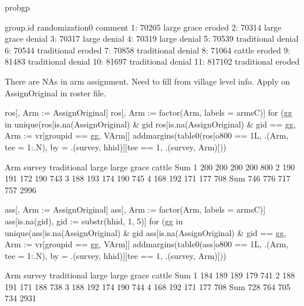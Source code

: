 \begin{Schunk}
\begin{Sinput}
probgp
\end{Sinput}
\begin{Soutput}
    group.id randomization0 comment
 1:    70205    large grace  eroded
 2:    70314    large grace  denial
 3:    70317          large  denial
 4:    70319          large  denial
 5:    70539    traditional  denial
 6:    70544    traditional  eroded
 7:    70858    traditional  denial
 8:    71064         cattle  eroded
 9:    81483    traditional  denial
10:    81697    traditional  denial
11:   817102    traditional  eroded
\end{Soutput}
\end{Schunk}
There are NAs in arm assignment. Need to fill from village level info. Apply on \textsf{AssignOriginal} in roster file.
\begin{Schunk}
\begin{Sinput}
ros[, Arm := AssignOriginal]
ros[, Arm := factor(Arm, labels = armsC)]
for (gg in unique(ros[is.na(AssignOriginal) & gid %in% vr[, groupid], gid]))
  ros[is.na(AssignOriginal) & gid == gg, Arm := vr[groupid == gg, VArm]]
addmargins(table0(ros[o800 == 1L, .(Arm, tee = 1:.N), 
  by = .(survey, hhid)][tee == 1, .(survey, Arm)]))
\end{Sinput}
\begin{Soutput}
      Arm
survey traditional large large grace cattle  Sum
   1           200   200         200    200  800
   2           190   191         172    190  743
   3           188   193         174    190  745
   4           168   192         171    177  708
   Sum         746   776         717    757 2996
\end{Soutput}
\begin{Sinput}
ass[, Arm := AssignOriginal]
ass[, Arm := factor(Arm, labels = armsC)]
ass[is.na(gid), gid := substr(hhid, 1, 5)]
for (gg in unique(ass[is.na(AssignOriginal) & gid %in% vr[, groupid], gid]))
  ass[is.na(AssignOriginal) & gid == gg, Arm := vr[groupid == gg, VArm]]
addmargins(table0(ass[o800 == 1L, .(Arm, tee = 1:.N), 
  by = .(survey, hhid)][tee == 1, .(survey, Arm)]))
\end{Sinput}
\begin{Soutput}
      Arm
survey traditional large large grace cattle  Sum
   1           184   189         189    179  741
   2           188   191         171    188  738
   3           188   192         174    190  744
   4           168   192         171    177  708
   Sum         728   764         705    734 2931
\end{Soutput}
\end{Schunk}
